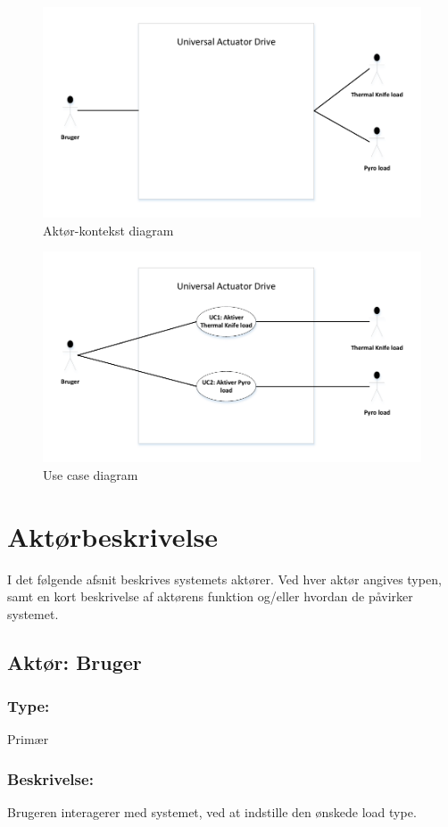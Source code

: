 \begin{figure}[H]
	\centering
	\includegraphics{tex/Kravspecifikation/billeder/AktorkontekstdiagramV1.pdf}
	\caption{Aktør-kontekst diagram}
\end{figure}

\begin{figure}[H]
	\centering
	\includegraphics{tex/Kravspecifikation/billeder/UseCasediagramV1.pdf}
	\caption{Use case diagram}
\end{figure}

\section{Aktørbeskrivelse}
I det følgende afsnit beskrives systemets aktører. Ved hver aktør angives typen, samt en kort beskrivelse af aktørens funktion og/eller hvordan de påvirker systemet.

\begin{framed}
	\subsection{Aktør: Bruger}
	\subsubsection*{Type:}
		Primær
	
	\subsubsection*{Beskrivelse:}
		Brugeren interagerer med systemet, ved at indstille den ønskede load type.
\end{framed}

